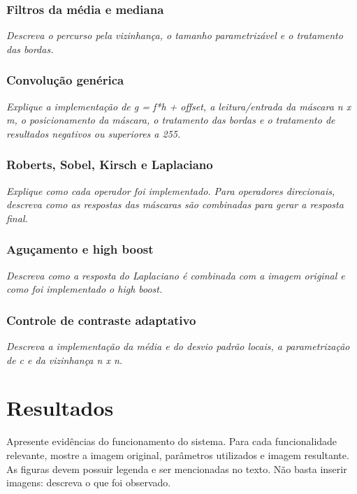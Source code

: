 \documentclass[11pt,a4paper]{article}
\newcommand{\placeholder}[1]{\textcolor{muted}{\textit{#1}}}
\begin{document}
\subsubsection{Filtros da média e mediana}
\placeholder{Descreva o percurso pela vizinhança, o tamanho parametrizável e o tratamento das bordas.}

\subsubsection{Convolução genérica}
\placeholder{Explique a implementação de g = f*h + offset, a leitura/entrada da máscara n x m, o posicionamento da máscara, o tratamento das bordas e o tratamento de resultados negativos ou superiores a 255.}

\subsubsection{Roberts, Sobel, Kirsch e Laplaciano}
\placeholder{Explique como cada operador foi implementado. Para operadores direcionais, descreva como as respostas das máscaras são combinadas para gerar a resposta final.}

\subsubsection{Aguçamento e high boost}
\placeholder{Descreva como a resposta do Laplaciano é combinada com a imagem original e como foi implementado o high boost.}

\subsubsection{Controle de contraste adaptativo}
\placeholder{Descreva a implementação da média e do desvio padrão locais, a parametrização de c e da vizinhança n x n.}

\section{Resultados}

\begin{orientacao}
Apresente evidências do funcionamento do sistema. Para cada funcionalidade relevante, mostre a imagem original, parâmetros utilizados e imagem resultante. As figuras devem possuir legenda e ser mencionadas no texto. Não basta inserir imagens: descreva o que foi observado.
\end{orientacao}
\end{document}
